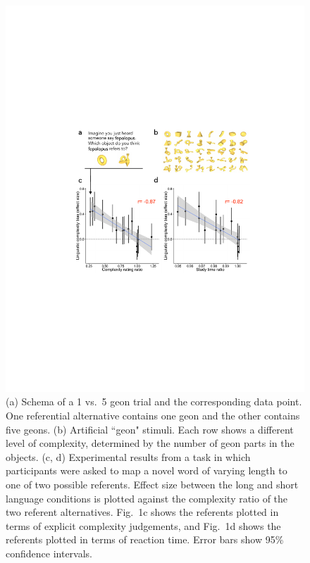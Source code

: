 \documentclass[12pt]{article}
\begin{document}
\begin{figure}[t!]
\begin{center}
\includegraphics{figs/FIG_1.pdf}
\caption{(a) Schema of a 1 vs.\ 5 geon trial and the corresponding data point. One referential alternative contains one geon and the other contains five geons. (b) Artificial ``geon" stimuli. Each row shows a different level of complexity, determined by the number of geon parts in the objects. (c, d) Experimental results from a task in which participants were asked to map a novel word of varying length to one of two possible referents. Effect size between the long and short language conditions is plotted against the complexity ratio of the two referent alternatives. Fig.\ 1c shows the referents plotted in terms of explicit complexity judgements, and Fig.\ 1d shows the referents plotted in terms of reaction time. Error bars show 95\% confidence intervals.}
\end{center}
\label{fig:geons}
\end{figure}
\end{document}
